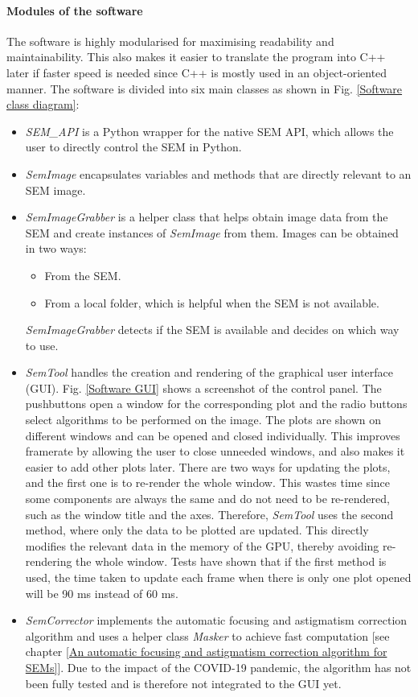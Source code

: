 \documentclass[12pt, twocolumn]{report}
\begin{document}
\paragraph{Modules of the software}
The software is highly modularised for maximising readability and maintainability. This also makes it easier to translate the program into C++ later if faster speed is needed since C++ is mostly used in an object-oriented manner. The software is divided into six main classes as shown in Fig. \ref{Software class diagram}:
\begin{itemize}
    \item \textit{SEM\_API} is a Python wrapper for the native SEM API, which allows the user to directly control the SEM in Python.
    \item \textit{SemImage} encapsulates variables and methods that are directly relevant to an SEM image.
    \item \textit{SemImageGrabber} is a helper class that helps obtain image data from the SEM and create instances of \textit{SemImage} from them. Images can be obtained in two ways:
    \begin{itemize}
        \item From the SEM.
        \item From a local folder, which is helpful when the SEM is not available.
    \end{itemize}
    \textit{SemImageGrabber} detects if the SEM is available and decides on which way to use.
    \item \textit{SemTool} handles the creation and rendering of the graphical user interface (GUI). Fig. \ref{Software GUI} shows a screenshot of the control panel. The pushbuttons open a window for the corresponding plot and the radio buttons select algorithms to be performed on the image. The plots are shown on different windows and can be opened and closed individually. This improves framerate by allowing the user to close unneeded windows, and also makes it easier to add other plots later. There are two ways for updating the plots, and the first one is to re-render the whole window. This wastes time since some components are always the same and do not need to be re-rendered, such as the window title and the axes. Therefore, \textit{SemTool} uses the second method, where only the data to be plotted are updated. This directly modifies the relevant data in the memory of the GPU, thereby avoiding re-rendering the whole window. Tests have shown that if the first method is used, the time taken to update each frame when there is only one plot opened will be 90 ms instead of 60 ms.
    \item \textit{SemCorrector} implements the automatic focusing and astigmatism correction algorithm and uses a helper class \textit{Masker} to achieve fast computation [see chapter \ref{An automatic focusing and astigmatism correction algorithm for SEMs}]. Due to the impact of the COVID-19 pandemic, the algorithm has not been fully tested and is therefore not integrated to the GUI yet.
\end{itemize}
\end{document}
